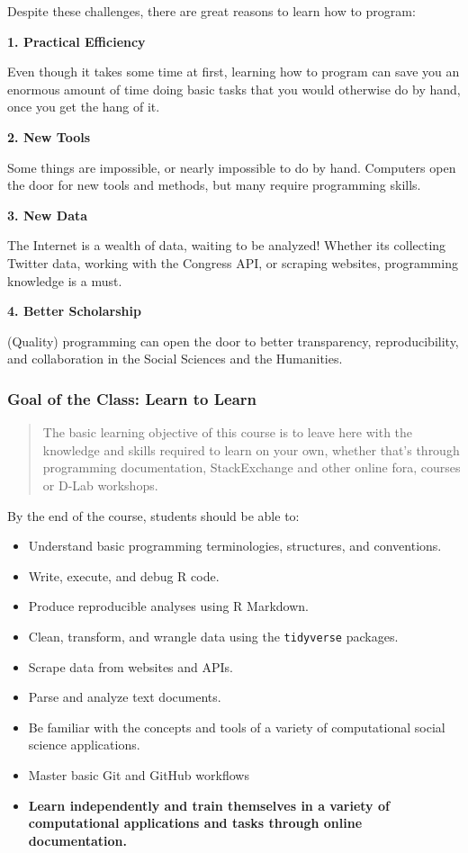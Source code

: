 \documentclass[]{book}
\providecommand{\tightlist}{%
  \setlength{\itemsep}{0pt}\setlength{\parskip}{0pt}}
\begin{document}
Despite these challenges, there are great reasons to learn how to
program:

\textbf{1. Practical Efficiency}

Even though it takes some time at first, learning how to program can
save you an enormous amount of time doing basic tasks that you would
otherwise do by hand, once you get the hang of it.

\textbf{2. New Tools}

Some things are impossible, or nearly impossible to do by hand.
Computers open the door for new tools and methods, but many require
programming skills.

\textbf{3. New Data}

The Internet is a wealth of data, waiting to be analyzed! Whether its
collecting Twitter data, working with the Congress API, or scraping
websites, programming knowledge is a must.

\textbf{4. Better Scholarship}

(Quality) programming can open the door to better transparency,
reproducibility, and collaboration in the Social Sciences and the
Humanities.

\subsubsection*{Goal of the Class: Learn to
Learn}\label{goal-of-the-class-learn-to-learn}

\begin{quote}
The basic learning objective of this course is to leave here with the
knowledge and skills required to learn on your own, whether that's
through programming documentation, StackExchange and other online fora,
courses or D-Lab workshops.
\end{quote}

By the end of the course, students should be able to:

\begin{itemize}
\tightlist
\item
  Understand basic programming terminologies, structures, and
  conventions.
\item
  Write, execute, and debug R code.
\item
  Produce reproducible analyses using R Markdown.
\item
  Clean, transform, and wrangle data using the \texttt{tidyverse}
  packages.
\item
  Scrape data from websites and APIs.
\item
  Parse and analyze text documents.
\item
  Be familiar with the concepts and tools of a variety of computational
  social science applications.
\item
  Master basic Git and GitHub workflows
\item
  \textbf{Learn independently and train themselves in a variety of
  computational applications and tasks through online documentation.}
\end{itemize}
\end{document}
